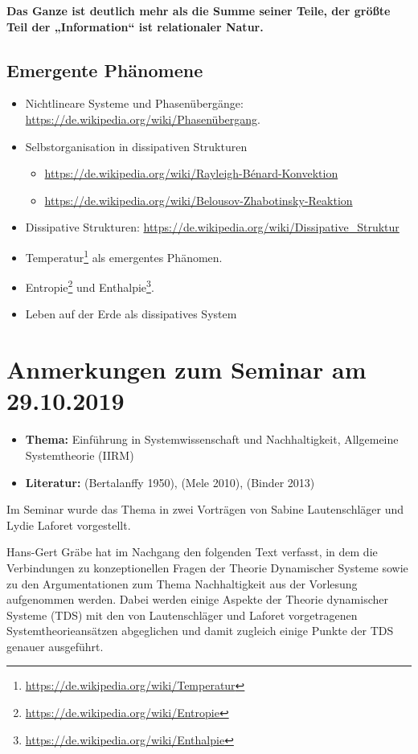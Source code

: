 \documentclass[11pt,a4paper]{article}
\begin{document}
\textbf{Das Ganze ist deutlich mehr als die Summe seiner Teile, der größte
  Teil der „Information“ ist relationaler Natur.}

\subsection{Emergente Phänomene}
\begin{itemize}
\item Nichtlineare Systeme und Phasenübergänge:\\
  \url{https://de.wikipedia.org/wiki/Phasenübergang}.
\item Selbstorganisation in dissipativen Strukturen
\begin{itemize}
  \item \url{https://de.wikipedia.org/wiki/Rayleigh-Bénard-Konvektion}
  \item \url{https://de.wikipedia.org/wiki/Belousov-Zhabotinsky-Reaktion}
\end{itemize}
\item Dissipative Strukturen:
  \url{https://de.wikipedia.org/wiki/Dissipative_Struktur} 
\item Temperatur\footnote{\url{https://de.wikipedia.org/wiki/Temperatur}} als
  emergentes Phänomen.
\item Entropie\footnote{\url{https://de.wikipedia.org/wiki/Entropie}} und
  Enthalpie\footnote{\url{https://de.wikipedia.org/wiki/Enthalpie}}.
\item Leben auf der Erde als dissipatives System
\end{itemize}

\section{Anmerkungen zum Seminar am 29.10.2019}
\begin{itemize}
\item \textbf{Thema:} Einführung in Systemwissenschaft und Nachhaltigkeit,
  Allgemeine System\-theorie (IIRM)
\item \textbf{Literatur:} (Bertalanffy 1950), (Mele 2010), (Binder 2013)
\end{itemize}

Im Seminar wurde das Thema in zwei Vorträgen von Sabine Lautenschläger und
Lydie Laforet vorgestellt.

Hans-Gert Gräbe hat im Nachgang den folgenden Text verfasst, in dem die
Verbindungen zu konzeptionellen Fragen der Theorie Dynamischer Systeme sowie
zu den Argumentationen zum Thema Nachhaltigkeit aus der Vorlesung aufgenommen
werden. Dabei werden einige Aspekte der Theorie dynamischer Systeme (TDS) mit
den von Lautenschläger und Laforet vorgetragenen Systemtheorieansätzen
abgeglichen und damit zugleich einige Punkte der TDS genauer ausgeführt.
\end{document}
